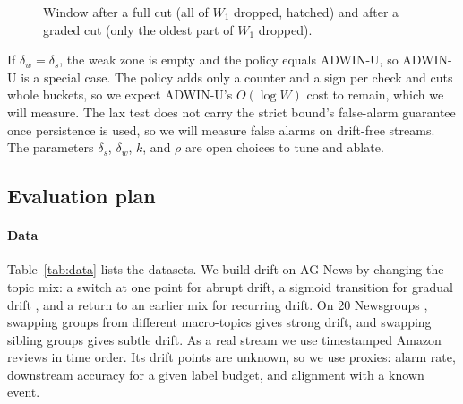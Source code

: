 \documentclass[conference]{IEEEtran}
\begin{document}
\begin{figure}[!t]
\centering
{}
\caption{Window after a full cut (all of $W_1$ dropped, hatched) and after a graded cut (only the oldest part of $W_1$ dropped).}
\label{fig:cuts}
\end{figure}

If $\delta_w=\delta_s$, the weak zone is empty and the policy equals ADWIN-U, so ADWIN-U is a special case. The policy adds only a counter and a sign per check and cuts whole buckets, so we expect ADWIN-U's $O(\log W)$ cost to remain, which we will measure. The lax test does not carry the strict bound's false-alarm guarantee once persistence is used, so we will measure false alarms on drift-free streams. The parameters $\delta_s$, $\delta_w$, $k$, and $\rho$ are open choices to tune and ablate.

\subsection{Evaluation plan}

\paragraph{Data}
Table~\ref{tab:data} lists the datasets. We build drift on AG News \cite{zhang2015} by changing the topic mix: a switch at one point for abrupt drift, a sigmoid transition for gradual drift \cite{bifet2010}, and a return to an earlier mix for recurring drift. On 20 Newsgroups \cite{lang1995}, swapping groups from different macro-topics gives strong drift, and swapping sibling groups gives subtle drift. As a real stream we use timestamped Amazon reviews \cite{ni2019} in time order. Its drift points are unknown, so we use proxies: alarm rate, downstream accuracy for a given label budget, and alignment with a known event.
\end{document}
